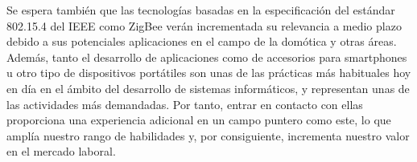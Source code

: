	Se espera también que las tecnologías basadas en la especificación del estándar 802.15.4 del IEEE
	como ZigBee verán incrementada su relevancia a medio plazo debido a sus potenciales aplicaciones en
	el campo de la domótica y otras áreas.\\

	Además, tanto el desarrollo de aplicaciones como de accesorios para smartphones u otro tipo de
	dispositivos portátiles son unas de las prácticas más habituales hoy en día en el ámbito del
	desarrollo de sistemas informáticos, y representan unas de las actividades más demandadas. Por
	tanto, entrar en contacto con ellas proporciona una experiencia adicional en un campo puntero como
	este, lo que amplía nuestro rango de habilidades y, por consiguiente, incrementa nuestro valor en 
	el mercado laboral.\\

